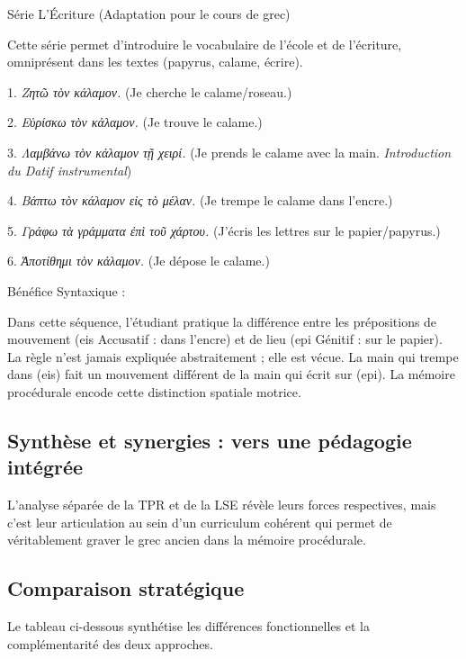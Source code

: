 Série \og L'Écriture\fg{} (Adaptation pour le cours de grec)

Cette série permet d'introduire le vocabulaire de l'école et de l'écriture, omniprésent dans les
textes (papyrus, calame, écrire).

1. \textit{Zητῶ τὸν κάλαμον.} (Je cherche le calame/roseau.)

2. \textit{Eὑρίσκω τὸν κάλαμον.} (Je trouve le calame.)

3. \textit{Λαμβάνω τὸν κάλαμον τῇ χειρί.} (Je prends le calame avec la main. \- \textit{Introduction
du Datif instrumental})

4. \textit{Bάπτω τὸν κάλαμον εἰς τὸ μέλαν.} (Je trempe le calame dans l'encre.)

5. \textit{Γράφω τὰ γράμματα ἐπὶ τοῦ χάρτου.} (J'écris les lettres sur le papier/papyrus.)

6. \textit{Ἀποτίθημι τὸν κάλαμον.} (Je dépose le calame.)

Bénéfice Syntaxique :

Dans cette séquence, l'étudiant pratique la différence entre les prépositions de mouvement (eis \+
Accusatif : dans l'encre) et de lieu (epi \+ Génitif : sur le papier). La \og règle\fg{} n'est
jamais expliquée abstraitement ; elle est vécue. La main qui trempe \og dans\fg{} (eis) fait un
mouvement différent de la main qui écrit \og sur\fg{} (epi). La mémoire procédurale encode cette
distinction spatiale motrice.



\subsection{Synthèse et synergies : vers une pédagogie intégrée}

L'analyse séparée de la TPR et de la LSE révèle leurs forces respectives, mais c'est leur
articulation au sein d'un curriculum cohérent qui permet de véritablement \og graver\fg{} le grec
ancien dans la mémoire procédurale.



\subsection{Comparaison stratégique}

Le tableau ci-dessous synthétise les différences fonctionnelles et la complémentarité des deux
approches.

